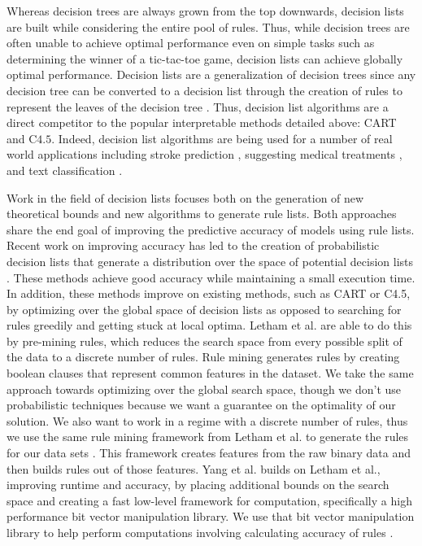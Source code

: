 Whereas decision trees are always grown from the top downwards, decision lists are built while considering the entire pool of rules.
Thus, while decision trees are often unable to achieve optimal performance even on simple tasks such as determining the winner of a tic-tac-toe game, decision lists can achieve globally optimal performance.
Decision lists are a generalization of decision trees since any decision tree can be converted to a decision list through the creation of rules to represent the leaves of the decision tree \cite{Rivest87}.
Thus, decision list algorithms are a direct competitor to the popular interpretable methods detailed above: CART and C$4.5$.
Indeed, decision list algorithms are being used for a number of real world applications including stroke prediction \cite{LethamRuMcMa15}, suggesting medical treatments \cite{ZhangLaTsDa2015}, and text classification \cite{LiYa02}.

Work in the field of decision lists focuses both on the generation of new theoretical bounds and new algorithms to generate rule lists.
Both approaches share the end goal of improving the predictive accuracy of models using rule lists.
Recent work on improving accuracy has led to the creation of probabilistic decision lists that generate a distribution over the space of potential decision lists \cite{LethamRuMcMa15,YangRuSe16}.
These methods achieve good accuracy while maintaining a small execution time.
In addition, these methods improve on existing methods, such as CART or C4.5, by optimizing over the global space of decision lists as opposed to searching for rules greedily and getting stuck at local optima.
Letham et al. are able to do this by pre-mining rules, which reduces the search space from every possible split of the data to a discrete number of rules.
Rule mining generates rules by creating boolean clauses that represent common features in the dataset.
We take the same approach towards optimizing over the global search space, though we don’t use probabilistic techniques because we want a guarantee on the optimality of our solution.
We also want to work in a regime with a discrete number of rules, thus we use the same rule mining framework from Letham et al. to generate the rules for our data sets \cite{LethamRuMcMa15}.
This framework creates features from the raw binary data and then builds rules out of those features.
Yang et al. builds on Letham et al., improving runtime and accuracy, by placing additional bounds on the search space and creating a fast low-level framework for computation, specifically a high performance bit vector manipulation library.
We use that bit vector manipulation library to help perform computations involving calculating accuracy of rules \cite{YangRuSe16}.


